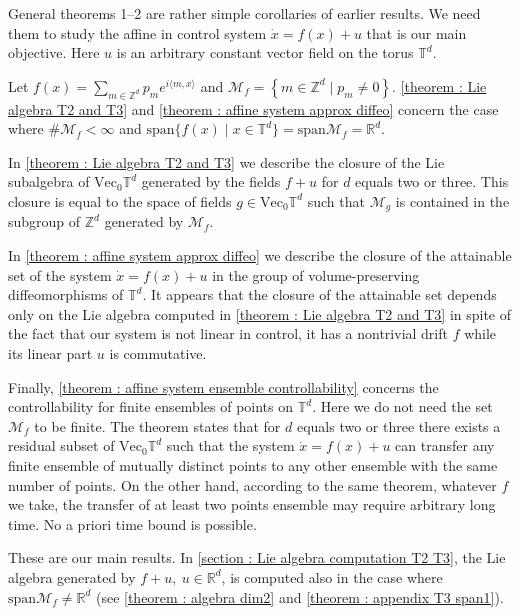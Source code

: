 \documentclass[10pt]{article}
\newcommand{\Z}{{\mathbb Z}}
\newcommand{\M}{{\mathcal M}}
\begin{document}
General theorems 1--2 are rather simple corollaries of earlier results. We need them to study the affine in control system $\dot x=f(x)+u$
that is our main objective. Here $u$ is an arbitrary constant vector field on the torus $\mathbb T^d$.

Let $f(x)=\sum\limits_{m\in\mathbb Z^d}p_me^{i\langle m,x\rangle}$ and $\M_f=\left\{m\in\Z^d \mid p_m\neq 0\right\}$. \cref{theorem : Lie algebra T2 and T3} and \cref{theorem : affine system approx diffeo}
concern the case where $\#\M_f<\infty$ and $\mathrm{span}\{f(x)\mid x\in\mathbb T^d\}=\mathrm{span}\M_f=\mathbb R^d$.

In \cref{theorem : Lie algebra T2 and T3} we describe the closure of the Lie subalgebra of $\mathrm{Vec}_0\mathbb T^d$ generated by the fields $f+u$ for $d$ equals two or three. This closure is equal
to the space of fields $g\in\mathrm{Vec}_0\mathbb T^d$ such that $\M_g$ is contained in the subgroup of $\mathbb Z^d$ generated by $\M_f$.

In \cref{theorem : affine system approx diffeo} we describe the closure of the attainable set of the system $\dot x=f(x)+u$ in the group of volume-preserving diffeomorphisms
of $\mathbb T^d$. It appears that the closure of the attainable set depends only on the Lie algebra computed in \cref{theorem : Lie algebra T2 and T3} in spite of the
fact that our system is not linear in control, it has a nontrivial drift $f$ while its linear part $u$ is commutative.

Finally, \cref{theorem : affine system ensemble controllability} concerns the controllability for finite ensembles of points on $\mathbb T^d$. Here we do not need the set $\M_f$ to be finite. The theorem states that for $d$ equals two or three there exists a residual subset of  $\mathrm{Vec}_0\mathbb T^d$ such that the system
$\dot x=f(x)+u$ can transfer any finite ensemble of mutually distinct points to any other ensemble with the same number of points.
On the other hand, according to the same theorem, whatever $f$ we take, the transfer of at least two points ensemble may require arbitrary long time. No a priori time bound is possible.

These are our main results. In \cref{section : Lie algebra computation T2 T3}, the Lie algebra generated by $f+u,\ u\in\mathbb R^d$, is computed also in the case where $\mathrm{span}\M_f\ne\mathbb R^d$ (see \cref{theorem : algebra dim2} and \cref{theorem : appendix T3 span1}).
\end{document}
